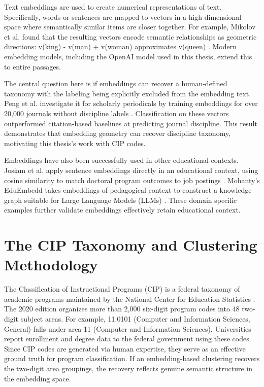 Text embeddings are used to create numerical representations of text. Specifically, words or sentences are mapped to vectors in a high-dimensional space where semantically similar items are closer together. For example, Mikolov et al. found that the resulting vectors encode semantic relationships as geometric directions: v(king) - v(man) + v(woman) approximates v(queen) \cite{Mikolov2013Word2Vec}. Modern embedding models, including the OpenAI model used in this thesis, extend this to entire passages.

The central question here is if embeddings can recover a human-defined taxonomy with the labeling being explicitly excluded from the embedding text. Peng et al. investigate it for scholarly periodicals by training embeddings for over 20,000 journals without discipline labels \cite{neural_embeddings}. Classification on these vectors outperformed citation-based baselines at predicting journal discipline. This result demonstrates that embedding geometry can recover discipline taxonomy, motivating this thesis's work with CIP codes. 

Embeddings have also been successfully used in other educational contexts. Josiam et al. apply sentence embeddings directly in an educational context, using cosine similarity to match doctoral program outcomes to job postings \cite{embedding_career_map}. Mohanty's EduEmbedd takes embeddings of pedagogical context to construct a knowledge graph suitable for Large Language Models (LLMs) \cite{edu_knowledge_graph}. These domain specific examples further validate embeddings effectively retain educational context.

\section{The CIP Taxonomy and Clustering Methodology}

The Classification of Instructional Programs (CIP) is a federal taxonomy of academic programs maintained by the National Center for Education Statistics \cite{NCES_CIP2020}. The 2020 edition organizes more than 2,000 six-digit program codes into 48 two-digit subject areas. For example, 11.0101 (Computer and Information Sciences, General) falls under area 11 (Computer and Information Sciences). Universities report enrollment and degree data to the federal government using these codes. Since CIP codes are generated via human expertise, they serve as an effective ground truth for program classification. If an embedding-based clustering recovers the two-digit area groupings, the recovery reflects genuine semantic structure in the embedding space.

